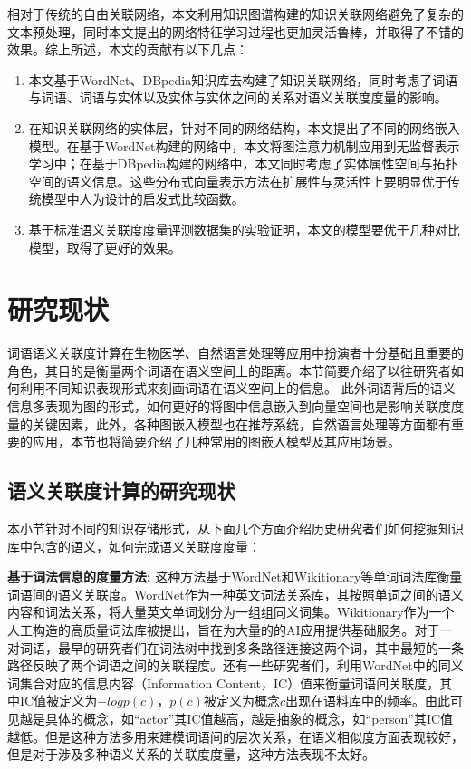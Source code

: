 相对于传统的自由关联网络，本文利用知识图谱构建的知识关联网络避免了复杂的文本预处理，同时本文提出的网络特征学习过程也更加灵活鲁棒，并取得了不错的效果。综上所述，本文的贡献有以下几点：
\begin{enumerate}
    \item 本文基于WordNet、DBpedia知识库去构建了知识关联网络，同时考虑了词语与词语、词语与实体以及实体与实体之间的关系对语义关联度度量的影响。
    \item 在知识关联网络的实体层，针对不同的网络结构，本文提出了不同的网络嵌入模型。在基于WordNet构建的网络中，本文将图注意力机制应用到无监督表示学习中；在基于DBpedia构建的网络中，本文同时考虑了实体属性空间与拓扑空间的语义信息。这些分布式向量表示方法在扩展性与灵活性上要明显优于传统模型中人为设计的启发式比较函数。
    \item 基于标准语义关联度度量评测数据集的实验证明，本文的模型要优于几种对比模型，取得了更好的效果。
\end{enumerate}

\section{研究现状}
词语语义关联度计算在生物医学、自然语言处理等应用中扮演者十分基础且重要的角色，其目的是衡量两个词语在语义空间上的距离。本节简要介绍了以往研究者如何利用不同知识表现形式来刻画词语在语义空间上的信息。
%
此外词语背后的语义信息多表现为图的形式，如何更好的将图中信息嵌入到向量空间也是影响关联度度量的关键因素，此外，各种图嵌入模型也在推荐系统，自然语言处理等方面都有重要的应用，本节也将简要介绍了几种常用的图嵌入模型及其应用场景。

\subsection{语义关联度计算的研究现状}
本小节针对不同的知识存储形式，从下面几个方面介绍历史研究者们如何挖掘知识库中包含的语义，如何完成语义关联度度量：

\textbf{基于词法信息的度量方法:}
这种方法基于WordNet和Wikitionary等单词词法库衡量词语间的语义关联度。WordNet作为一种英文词法关系库，其按照单词之间的语义内容和词法关系，将大量英文单词划分为一组组同义词集。Wikitionary\cite{aaai/ZeschMG08}作为一个人工构造的高质量词法库被提出，旨在为大量的的AI应用提供基础服务。对于一对词语，最早的研究者们\cite{its/Rada89, Leacock98, wu1994verb, tkde/LiBM03}在词法树中找到多条路径连接这两个词，其中最短的一条路径反映了两个词语之间的关联程度。还有一些研究者们，利用WordNet中的同义词集合对应的信息内容（Information Content，IC）值来衡量词语间关联度\cite{ijcai/Resnik95, RCLIC/Jiang97, icml/Lin98}，其中IC值被定义为$-log p(c)$，$p(c)$被定义为概念$c$出现在语料库中的频率。由此可见越是具体的概念，如“actor”其IC值越高，越是抽象的概念，如“person”其IC值越低。但是这种方法多用来建模词语间的层次关系，在语义相似度方面表现较好，但是对于涉及多种语义关系的关联度度量，这种方法表现不太好。

